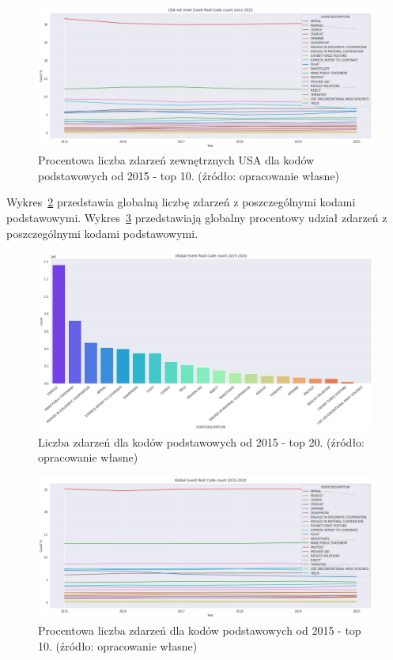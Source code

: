 \documentclass[11pt]{report}
\begin{document}
    \begin{figure}[!htp]
        \centering
        \includegraphics[width=\linewidth]{fig/USA not inner/ERCperc.png}
        \caption{Procentowa liczba zdarzeń zewnętrznych USA dla kodów podstawowych od 2015 - top 10. (źródło: opracowanie własne)}
        \label{fig:USA_not_inner_ERCperc}
    \end{figure}

    Wykres~\ref{fig:GLOBAL_ERC} przedstawia globalną liczbę zdarzeń z poszczególnymi kodami podstawowymi.
    Wykres~\ref{fig:GLOBAL_ERCperc} przedstawiają globalny procentowy udział zdarzeń z poszczególnymi kodami podstawowymi.

    \begin{figure}[!htp]
        \centering
        \includegraphics[width=\linewidth]{fig/GLOBAL//ERC.png}
        \caption{Liczba zdarzeń dla kodów podstawowych od 2015 - top 20. (źródło: opracowanie własne)}
        \label{fig:GLOBAL_ERC}
    \end{figure}

    \begin{figure}[!htp]
        \centering
        \includegraphics[width=\linewidth]{fig/GLOBAL/ERCperc.png}
        \caption{Procentowa liczba zdarzeń dla kodów podstawowych od 2015 - top 10. (źródło: opracowanie własne)}
        \label{fig:GLOBAL_ERCperc}
    \end{figure}
\end{document}
